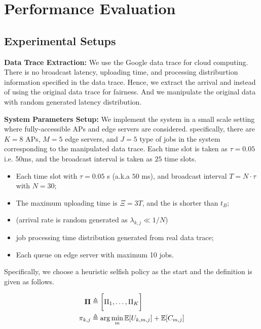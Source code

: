 \section{Performance Evaluation}
\label{sec:evaluation}


\subsection{Experimental Setups}

\textbf{Data Trace Extraction:}
We use the Google data trace for cloud computing.
There is no broadcast latency, uploading time, and processing distriburtion information specified in the data trace.
Hence, we extract the arrival and instead of using the original data trace for fairness.
And we manipulate the original data with random generated latency distribution.

\textbf{System Parameters Setup:}
We implement the system in a small scale setting where fully-accessible APs and edge servers are considered.
specifically, there are $K=8$ APs, $M=5$ edge servers, and $J=5$ type of jobs in the system corresponding to the manipulated data trace.
Each time slot is taken as $\tau = 0.05$ i.e. 50ms, and the broadcast interval is taken as $25$ time slots.

\begin{itemize}
    \item Each time slot with $\tau=0.05$ s (a.k.a $50$ ms), and broadcast interval $T=N \cdot \tau$ with $N=30$;
    \item The maximum uploading time is $\Xi = 3 T$, and the \brlatency is shorter than $t_B$;
    \item (arrival rate is random generated as $\lambda_{k,j} \ll 1/N$)
    \item job processing time distribution generated from real data trace;
    \item Each queue on edge server with maximum 10 jobs.
\end{itemize}

Specifically, we choose a heuristic selfish policy as the start and the definition is given as follows.
\begin{definition}
    \begin{align}
        \boldsymbol{\Pi} &\triangleq \bigg[ \Pi_{1}, \dots, \Pi_{K} \bigg]
        \\
        \pi_{k,j} &\triangleq \arg\min_{m} \mathbb{E}[U_{k,m,j}] + \mathbb{E}[C_{m,j}]
    \end{align}
\end{definition}

